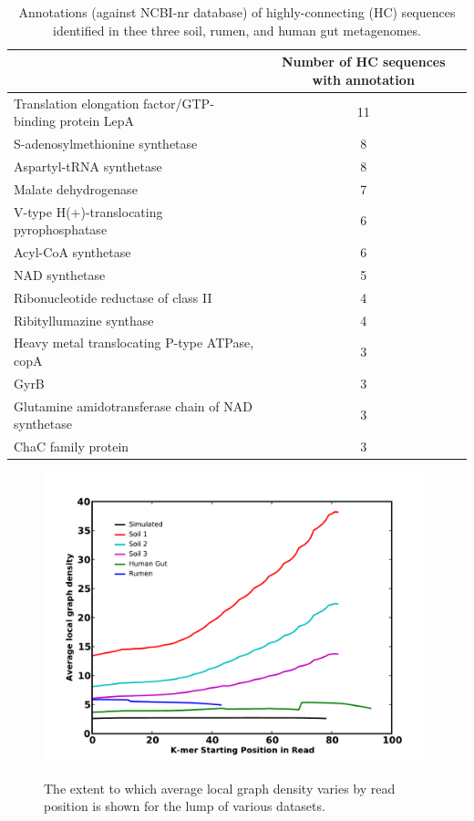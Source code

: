 \documentclass[10pt]{article}
\begin{document}
\begin{table}
\caption{Annotations (against NCBI-nr database) of highly-connecting (HC) sequences identified in thee three soil, rumen, and human gut metagenomes.}
\begin{tabular}{l c}
\hline
& Number of HC sequences with annotation \\
\hline
Translation elongation factor/GTP-binding protein LepA	&11\\
S-adenosylmethionine synthetase	&8\\
Aspartyl-tRNA synthetase	 &8\\
Malate dehydrogenase	&7\\
V-type H(+)-translocating pyrophosphatase	&6\\
Acyl-CoA synthetase	&6\\
NAD synthetase 	&5\\
Ribonucleotide reductase of class II	&4\\
Ribityllumazine synthase	&4\\
Heavy metal translocating P-type ATPase, copA	&3\\
GyrB	 &3\\
Glutamine amidotransferase chain of NAD synthetase	&3\\
ChaC family protein	&3\\
\end{tabular}
\label{meta-stoptags}
\end{table}

\begin{figure}[h]
\center
{\includegraphics[width=5in]{./figure1-density.pdf}}
\caption{The extent to which average local graph density varies by read position is shown for the lump of various datasets.}
\label{density-pos}
\end{figure}
\end{document}

